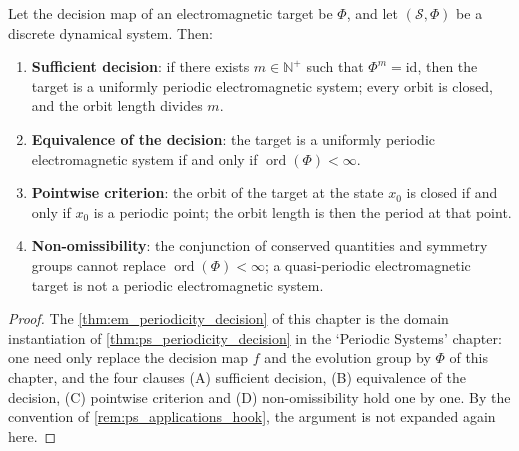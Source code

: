 \begin{theorem}\label{thm:em_periodicity_decision}
Let the decision map of an electromagnetic target be $\Phi$, and let $(\mathcal S,\Phi)$ be a discrete dynamical system. Then:
\begin{enumerate}[label=(\Alph*)]
    \item \textbf{Sufficient decision}: if there exists $m\in\mathbb N^+$ such that $\Phi^m=\mathrm{id}$, then the target is a uniformly periodic electromagnetic system; every orbit is closed, and the orbit length divides $m$.
    \item \textbf{Equivalence of the decision}: the target is a uniformly periodic electromagnetic system if and only if $\operatorname{ord}(\Phi)<\infty$.
    \item \textbf{Pointwise criterion}: the orbit of the target at the state $x_0$ is closed if and only if $x_0$ is a periodic point; the orbit length is then the period at that point.
    \item \textbf{Non-omissibility}: the conjunction of conserved quantities and symmetry groups cannot replace $\operatorname{ord}(\Phi)<\infty$; a quasi-periodic electromagnetic target is not a periodic electromagnetic system.
\end{enumerate}
\end{theorem}

\begin{proof}
The \cref{thm:em_periodicity_decision} of this chapter is the domain instantiation of \cref{thm:ps_periodicity_decision} in the `Periodic Systems' chapter:
one need only replace the decision map $f$ and the evolution group by $\Phi$ of this chapter, and the four clauses (A) sufficient decision, (B) equivalence of the decision, (C) pointwise criterion and
(D) non-omissibility hold one by one. By the convention of \cref{rem:ps_applications_hook}, the argument is not expanded again here.
\end{proof}

